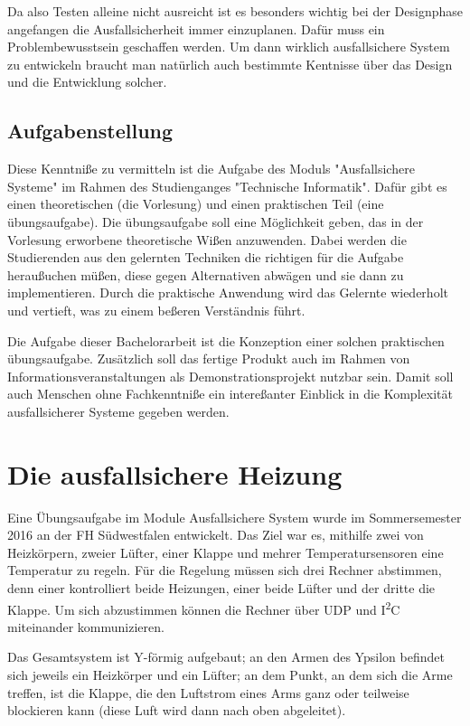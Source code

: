 Da also Testen alleine nicht ausreicht ist es besonders wichtig bei der Designphase angefangen die Ausfallsicherheit immer einzuplanen. Daf{\"{u}}r
muss ein Problembewusstsein geschaffen werden. Um dann wirklich ausfallsichere System zu entwickeln braucht man nat{\"{u}}rlich auch bestimmte Kentnisse 
{\"{u}}ber das Design und die Entwicklung solcher.

\subsection{Aufgabenstellung} 
Diese Kenntni{\ss}e zu vermitteln ist die Aufgabe des Moduls "Ausfallsichere Systeme" im Rahmen des Studienganges 
"Technische Informatik". Daf{\"{u}}r gibt es einen theoretischen (die Vorlesung) und einen praktischen Teil (eine 
{\"{u}}bungsaufgabe). Die {\"{u}}bungsaufgabe soll eine M{\"{o}}glichkeit geben, das in der Vorlesung erworbene 
theoretische Wi{\ss}en anzuwenden. Dabei werden die Studierenden aus den gelernten Techniken die richtigen 
f{\"{u}}r die Aufgabe herau{\ss}uchen m{\"{u}}{\ss}en, diese gegen Alternativen abw{\"{a}}gen und sie dann zu 
implementieren. Durch die  praktische Anwendung wird das Gelernte wiederholt und vertieft, was zu einem be{\ss}eren 
Verst{\"{a}}ndnis f{\"{u}}hrt. 

Die Aufgabe dieser Bachelorarbeit ist die Konzeption einer solchen praktischen {\"{u}}bungsaufgabe. 
Zus{\"{a}}tzlich soll das fertige Produkt auch im Rahmen von Informationsveranstaltungen als Demonstrationsprojekt 
nutzbar sein. Damit soll auch Menschen ohne Fachkenntni{\ss}e ein intere{\ss}anter Einblick in die 
Komplexit{\"{a}}t ausfallsicherer Systeme gegeben werden.

\clearpage
\section{Die ausfallsichere Heizung}\label{heizung}
Eine {\"{U}}bungsaufgabe im Module Ausfallsichere System wurde im Sommersemester 2016 an der FH S{\"{u}}dwestfalen entwickelt. Das Ziel war es, mithilfe zwei von Heizk{\"{o}}rpern, zweier
L{\"{u}}fter, einer Klappe und mehrer Temperatursensoren eine Temperatur zu regeln. F{\"{u}}r die Regelung m{\"{u}}ssen sich drei Rechner abstimmen, denn einer kontrolliert
beide Heizungen, einer beide L{\"{u}}fter und der dritte die Klappe. Um sich abzustimmen k{\"{o}}nnen die Rechner {\"{u}}ber UDP und I\textsuperscript{2}C miteinander kommunizieren.

Das Gesamtsystem ist Y-f{\"{o}}rmig aufgebaut; an den Armen des Ypsilon befindet sich jeweils ein Heizk{\"{o}}rper und ein L{\"{u}}fter; an dem Punkt, an dem sich
die Arme treffen, ist die Klappe, die den Luftstrom eines Arms ganz oder teilweise blockieren kann (diese Luft wird dann nach oben abgeleitet).

